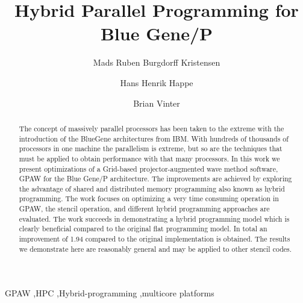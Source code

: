 \documentclass[preprint,3p,times,twocolumn]{elsarticle}
\begin{document}
\begin{frontmatter}



\title{Hybrid Parallel Programming for Blue Gene/P}


\author{Mads Ruben Burgdorff Kristensen}
\author{Hans Henrik Happe}
\author{Brian Vinter}
\address{eScience Center - University of Copenhagen Denmark}

\begin{abstract}
The concept of massively parallel processors has been taken to the extreme with the introduction of the BlueGene architectures from IBM. With hundreds of thousands of processors in one machine the parallelism is extreme, but so are the techniques that must be applied to obtain performance with that many processors. 
In this work we present optimizations of a Grid-based projector-augmented wave method software, GPAW \cite{Mortensen05} for the Blue Gene/P architecture. The improvements are achieved by exploring the advantage of shared and distributed memory programming also known as hybrid programming. The work focuses on optimizing a very time consuming operation in GPAW, the stencil operation, and different hybrid programming approaches are evaluated. The work succeeds in demonstrating a hybrid programming model which is clearly beneficial compared to the original flat programming model. In total an improvement of 1.94 compared to the original implementation is obtained. The results we demonstrate here are reasonably general and may be applied to other stencil codes.
\end{abstract}

\begin{keyword}
GPAW \sep HPC \sep Hybrid-programming \sep multicore platforms


\end{keyword}

\end{frontmatter}
\end{document}
